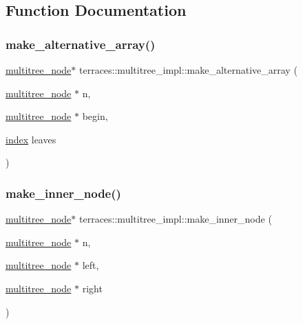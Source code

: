 \subsection{Function Documentation}
\mbox{\label{namespaceterraces_1_1multitree__impl_adb494a0d2be0b11b08344ee2a2251eab}} 
\subsubsection{\texorpdfstring{make\+\_\+alternative\+\_\+array()}{make\_alternative\_array()}}
{\footnotesize\ttfamily \hyperlink{structterraces_1_1multitree__node}{multitree\+\_\+node}$\ast$ terraces\+::multitree\+\_\+impl\+::make\+\_\+alternative\+\_\+array (\begin{DoxyParamCaption}\item[{\hyperlink{structterraces_1_1multitree__node}{multitree\+\_\+node} $\ast$}]{n,  }\item[{\hyperlink{structterraces_1_1multitree__node}{multitree\+\_\+node} $\ast$}]{begin,  }\item[{\hyperlink{namespaceterraces_adbc33ccb543d1634e96d0eb02e472c77}{index}}]{leaves }\end{DoxyParamCaption})\hspace{0.3cm}{\ttfamily [inline]}}

\mbox{\label{namespaceterraces_1_1multitree__impl_aea68de8e6794640633d087a3911b38af}} 
\subsubsection{\texorpdfstring{make\+\_\+inner\+\_\+node()}{make\_inner\_node()}}
{\footnotesize\ttfamily \hyperlink{structterraces_1_1multitree__node}{multitree\+\_\+node}$\ast$ terraces\+::multitree\+\_\+impl\+::make\+\_\+inner\+\_\+node (\begin{DoxyParamCaption}\item[{\hyperlink{structterraces_1_1multitree__node}{multitree\+\_\+node} $\ast$}]{n,  }\item[{\hyperlink{structterraces_1_1multitree__node}{multitree\+\_\+node} $\ast$}]{left,  }\item[{\hyperlink{structterraces_1_1multitree__node}{multitree\+\_\+node} $\ast$}]{right }\end{DoxyParamCaption})\hspace{0.3cm}{\ttfamily [inline]}}


